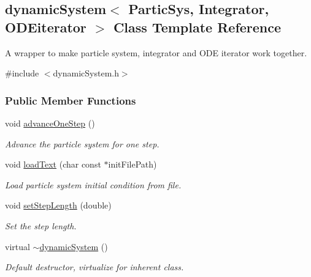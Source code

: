\hypertarget{classdynamic_system}{}\subsection{dynamic\+System$<$ Partic\+Sys, Integrator, O\+D\+Eiterator $>$ Class Template Reference}
\label{classdynamic_system}


A wrapper to make particle system, integrator and O\+DE iterator work together.  




{\ttfamily \#include $<$dynamic\+System.\+h$>$}

\subsubsection*{Public Member Functions}
\begin{DoxyCompactItemize}
\item 
void \mbox{\hyperlink{classdynamic_system_a3b6569e359c6451a038107455903c6a1}{advance\+One\+Step}} ()
\begin{DoxyCompactList}\small\item\em Advance the particle system for one step. \end{DoxyCompactList}\item 
void \mbox{\hyperlink{classdynamic_system_a44849a58489dd8c300edc920f793c56a}{load\+Text}} (char const $\ast$init\+File\+Path)
\begin{DoxyCompactList}\small\item\em Load particle system initial condition from file. \end{DoxyCompactList}\item 
void \mbox{\hyperlink{classdynamic_system_af1b1ccfa965c677bd66029b42377117d}{set\+Step\+Length}} (double)
\begin{DoxyCompactList}\small\item\em Set the step length. \end{DoxyCompactList}\item 
virtual \mbox{\hyperlink{classdynamic_system_a5818e6ffd72fcbfcac01738f5cb8d7a3}{$\sim$dynamic\+System}} ()
\begin{DoxyCompactList}\small\item\em Default destructor, virtualize for inherent class. \end{DoxyCompactList}\end{DoxyCompactItemize}
